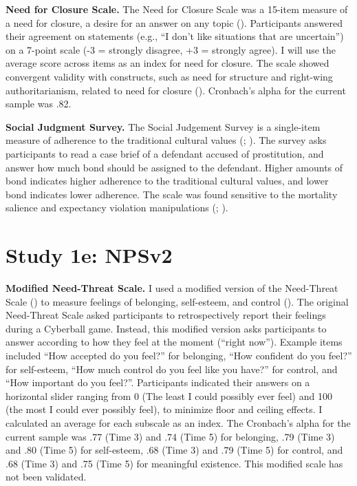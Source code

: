 \documentclass[
]{udthesis}
\begin{document}
\textbf{Need for Closure Scale.} The Need for Closure Scale was a 15-item measure of a need for closure, a desire for an answer on any topic (). Participants answered their agreement on statements (e.g., ``I don't like situations that are uncertain'') on a 7-point scale (-3 = strongly disagree, +3 = strongly agree). I will use the average score across items as an index for need for closure. The scale showed convergent validity with constructs, such as need for structure and right-wing authoritarianism, related to need for closure (). Cronbach's alpha for the current sample was .82.

\textbf{Social Judgment Survey.} The Social Judgement Survey is a single-item measure of adherence to the traditional cultural values (; ). The survey asks participants to read a case brief of a defendant accused of prostitution, and answer how much bond should be assigned to the defendant. Higher amounts of bond indicates higher adherence to the traditional cultural values, and lower bond indicates lower adherence. The scale was found sensitive to the mortality salience and expectancy violation manipulations (; ).

\section{Study 1e: NPSv2}\label{study-1e-npsv2-1}

\textbf{Modified Need-Threat Scale.} I used a modified version of the Need-Threat Scale () to measure feelings of belonging, self-esteem, and control (). The original Need-Threat Scale asked participants to retrospectively report their feelings during a Cyberball game. Instead, this modified version asks participants to answer according to how they feel at the moment (``right now''). Example items included ``How accepted do you feel?'' for belonging, ``How confident do you feel?'' for self-esteem, ``How much control do you feel like you have?'' for control, and ``How important do you feel?''. Participants indicated their answers on a horizontal slider ranging from 0 (The least I could possibly ever feel) and 100 (the most I could ever possibly feel), to minimize floor and ceiling effects. I calculated an average for each subscale as an index. The Cronbach's alpha for the current sample was .77 (Time 3) and .74 (Time 5) for belonging, .79 (Time 3) and .80 (Time 5) for self-esteem, .68 (Time 3) and .79 (Time 5) for control, and .68 (Time 3) and .75 (Time 5) for meaningful existence. This modified scale has not been validated.
\end{document}
